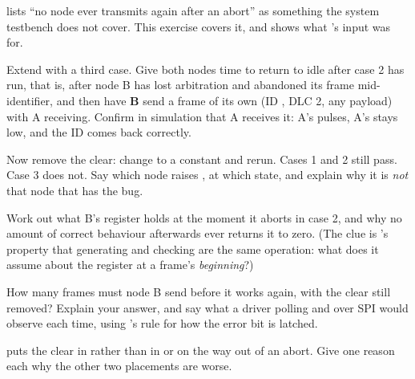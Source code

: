 \label{c19:ex:afterabort}
 lists ``no node ever transmits again after an abort'' as something the system
testbench does not cover. This exercise covers it, and shows what 's  input
was for.

 Extend  with a third case. Give both nodes time to return to
idle after case 2 has run, that is, after node B has lost arbitration and abandoned its frame
mid-identifier, and then have \textbf{B} send a frame of its own (ID , DLC 2, any payload)
with A receiving. Confirm in simulation that A receives it: A's  pulses, A's
 stays low, and the ID comes back correctly.

 Now remove the clear: change  to a constant  and rerun. Cases 1
and 2 still pass. Case 3 does not. Say which node raises , at which state, and explain why
it is \emph{not} that node that has the bug.

 Work out what B's  register holds at the moment it aborts in case 2, and why no
amount of correct behaviour afterwards ever returns it to zero. (The clue is 's
property that generating and checking are the same operation: what does it assume about the register
at a frame's \emph{beginning}?)

 How many frames must node B send before it works again, with the clear still removed?
Explain your answer, and say what a driver polling  and  over SPI would
observe each time, using 's rule for how the error bit is latched.

  puts the clear in  rather than in  or
on the way out of an abort. Give one reason each why the other two placements are worse.
